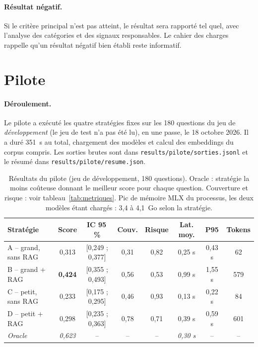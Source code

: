 \documentclass[11pt,a4paper]{article}
\begin{document}
\paragraph{Résultat négatif.} Si le critère principal n'est pas atteint, le résultat sera rapporté tel
quel, avec l'analyse des catégories et des signaux responsables. Le cahier des charges rappelle qu'un
résultat négatif bien établi reste informatif.

\section{Pilote}\label{sec:pilote}

\paragraph{Déroulement.} Le pilote a exécuté les quatre stratégies fixes sur les 180 questions du jeu de
\emph{développement} (le jeu de test n'a pas été lu), en une passe, le 18 octobre 2026. Il a duré
351~s au total, chargement des modèles et calcul des embeddings du corpus compris. Les sorties brutes
sont dans \texttt{results/pilote/sorties.jsonl} et le résumé dans \texttt{results/pilote/resume.json}.

\begin{table}[H]
\centering\footnotesize\setlength{\tabcolsep}{3.5pt}
\begin{tabular}{l c c c c c c c}
\toprule
\textbf{Stratégie} & \textbf{Score} & \textbf{IC 95\,\%} & \textbf{Couv.} & \textbf{Risque} & \textbf{Lat. moy.} & \textbf{P95} & \textbf{Tokens} \\
\midrule
A -- grand, sans RAG & 0,313 & [0,249 ; 0,377] & 0,31 & 0,82 & 0,25 s & 0,43 s & 62 \\
B -- grand + RAG     & \textbf{0,424} & [0,355 ; 0,493] & 0,56 & 0,53 & 0,99 s & 1,55 s & 579 \\
C -- petit, sans RAG & 0,233 & [0,175 ; 0,295] & 0,46 & 0,93 & 0,13 s & 0,22 s & 84 \\
D -- petit + RAG     & 0,298 & [0,235 ; 0,363] & 0,78 & 0,71 & 0,39 s & 0,59 s & 601 \\
\midrule
\textit{Oracle} & \textit{0,623} & -- & -- & -- & \textit{0,30 s} & -- & -- \\
\bottomrule
\end{tabular}
\caption{Résultats du pilote (jeu de développement, 180 questions). Oracle : stratégie la moins coûteuse donnant le meilleur score pour chaque question. Couverture et
risque : voir tableau~\ref{tab:metriques}. Pic de mémoire MLX du processus, les deux modèles étant chargés :
3,4 à 4,1~Go selon la stratégie.}
\label{tab:pilote}
\end{table}
\end{document}
